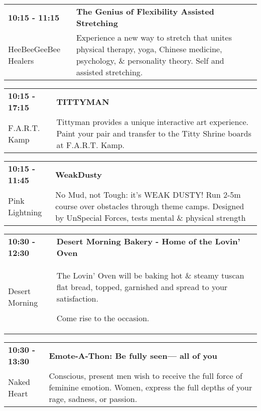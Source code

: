 \begin{tabular}{ p{1in} p{2.2in} }
    \textbf{10:15 - 11:15} & \textbf{The Genius of Flexibility  Assisted Stretching} \\
    HeeBeeGeeBee Healers \newline  & Experience a new way to stretch that unites physical therapy, yoga, Chinese medicine, psychology, \& personality theory. Self and assisted stretching. \\
    \hline 
\end{tabular}
    
\begin{tabular}{ p{1in} p{2.2in} }
    \textbf{10:15 - 17:15} & \textbf{TITTYMAN} \\
    F.A.R.T. Kamp \newline  & Tittyman provides a unique interactive art experience. Paint your pair and transfer to the Titty Shrine boards at F.A.R.T. Kamp. \\
    \hline 
\end{tabular}
    
\begin{tabular}{ p{1in} p{2.2in} }
    \textbf{10:15 - 11:45} & \textbf{WeakDusty} \\
    Pink Lightning \newline  & No Mud, not Tough: it's WEAK DUSTY! Run 2-5m course over obstacles through theme camps. Designed by UnSpecial Forces, tests mental \& physical strength \\
    \hline 
\end{tabular}
    
\begin{tabular}{ p{1in} p{2.2in} }
    \textbf{10:30 - 12:30} & \textbf{Desert Morning Bakery - Home of the Lovin' Oven} \\
    Desert Morning \newline  & The Lovin' Oven will be baking hot \& steamy tuscan flat bread, topped, garnished and spread to your satisfaction.

Come rise to the occasion. \\
    \hline 
\end{tabular}
    
\begin{tabular}{ p{1in} p{2.2in} }
    \textbf{10:30 - 13:30} & \textbf{Emote-A-Thon: Be fully seen--- all of you} \\
    Naked Heart \newline  & Conscious, present men wish to receive the full force of feminine emotion. Women, express the full depths of your rage, sadness, or passion. \\
    \hline 
\end{tabular}
    
